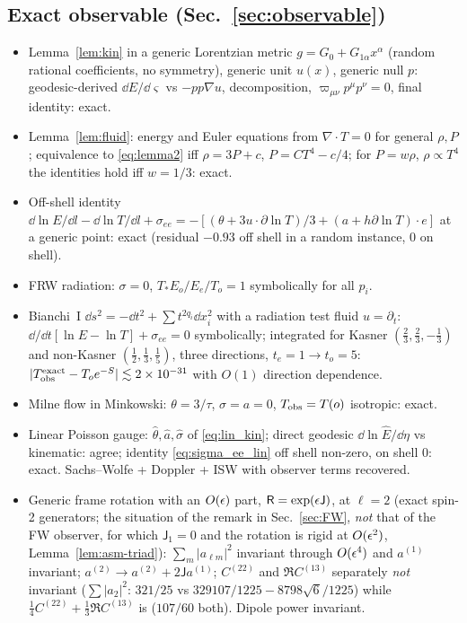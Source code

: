 \subsection*{Exact observable (Sec.~\ref{sec:observable})}
\begin{itemize}\itemsep1pt
\item[X-1] Lemma~\ref{lem:kin} in a generic Lorentzian metric $g=G_0+G_{1\alpha}x^\alpha$ (random rational coefficients, no symmetry), generic unit $u(x)$, generic null $p$: geodesic-derived $\dd E/\dd\varsigma$ vs $-pp\nabla u$, decomposition, $\varpi_{\mu\nu}p^\mu p^\nu=0$, final identity: exact.
\item[X-2] Lemma~\ref{lem:fluid}: energy and Euler equations from $\nabla\cdot T=0$ for general $\rho,P$; equivalence to \eqref{eq:lemma2} iff $\rho=3P+c$, $P=CT^4-c/4$; for $P=w\rho$, $\rho\propto T^4$ the identities hold iff $w=1/3$: exact.
\item[X-3] Off-shell identity $\dd\ln E/\dd l-\dd\ln T/\dd l+\sigma_{ee}=-[(\theta+3u\cdot\partial\ln T)/3+(a+h\partial\ln T)\cdot e]$ at a generic point: exact (residual $-0.93$ off shell in a random instance, $0$ on shell).
\item[X-4a] FRW radiation: $\sigma=0$, $T_*E_o/E_e/T_o=1$ symbolically for all $p_i$.
\item[X-4b] Bianchi~I $\dd s^2=-\dd t^2+\sum t^{2q_i}\dd x_i^2$ with a radiation test fluid $u=\partial_t$: $\dd/\dd t[\ln E-\ln T]+\sigma_{ee}=0$ symbolically; integrated for Kasner $(\tfrac23,\tfrac23,-\tfrac13)$ and non-Kasner $(\tfrac12,\tfrac13,\tfrac15)$, three directions, $t_e=1\to t_o=5$: $|T_{\rm obs}^{\rm exact}-T_oe^{-S}|\lesssim2\times10^{-31}$ with $O(1)$ direction dependence.
\item[X-4c] Milne flow in Minkowski: $\theta=3/\tau$, $\sigma=a=0$, $T_{\rm obs}=T(o)$ isotropic: exact.
\item[X-5] Linear Poisson gauge: $\hat\theta,\hat a,\hat\sigma$ of \eqref{eq:lin_kin}; direct geodesic $\dd\ln\hat E/\dd\eta$ vs kinematic: agree; identity \eqref{eq:sigma_ee_lin} off shell non-zero, on shell $0$: exact.  Sachs--Wolfe + Doppler + ISW with observer terms recovered.
\item[X-6] Generic frame rotation with an $O(\epsilon)$ part, $\mathsf R=\exp(\epsilon\mathsf J)$, at $\ell=2$ (exact spin-2 generators; the situation of the remark in Sec.~\ref{sec:FW}, \emph{not} that of the FW observer, for which $\mathsf J_1=0$ and the rotation is rigid at $O(\epsilon^2)$, Lemma~\ref{lem:asm-triad}): $\sum_m|a_{\ell m}|^2$ invariant through $O(\epsilon^4)$ and $a^{(1)}$ invariant; $a^{(2)}\to a^{(2)}+2\mathsf Ja^{(1)}$; $C^{(22)}$ and $\Re C^{(13)}$ separately \emph{not} invariant ($\sum|a_2|^2$: $321/25$ vs $329107/1225-8798\sqrt6/1225$) while $\tfrac14C^{(22)}+\tfrac13\Re C^{(13)}$ is ($107/60$ both).  Dipole power invariant.
\end{itemize}


